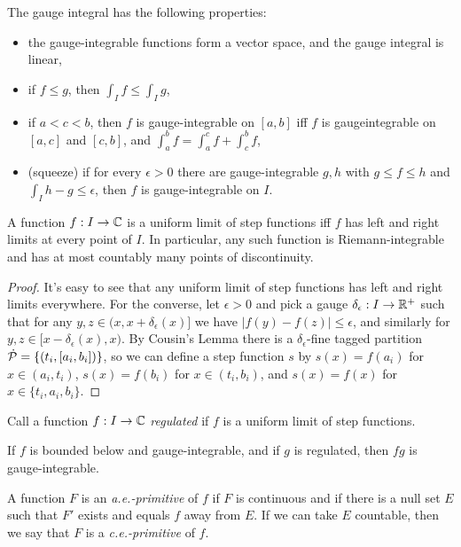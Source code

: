 \begin{prop} The gauge integral has the following properties:
\begin{itemize}
\item the gauge-integrable functions form a vector space, and the gauge integral is linear,
\item if $f \le g$, then $\int_I f \le \int_I g$,
\item if $a < c < b$, then $f$ is gauge-integrable on $[a,b]$ iff $f$ is gaugeintegrable on $[a,c]$ and $[c,b]$, and $\int_a^b f = \int_a^c f + \int_c^b f$,
\item (squeeze) if for every $\epsilon > 0$ there are gauge-integrable $g,h$ with $g \le f \le h$ and $\int_I h-g \le \epsilon$, then $f$ is gauge-integrable on $I$.
\end{itemize}
\end{prop}

\begin{prop} A function $f : I \rightarrow \mathbb{C}$ is a uniform limit of step functions iff $f$ has left and right limits at every point of $I$. In particular, any such function is Riemann-integrable and has at most countably many points of discontinuity.
\end{prop}
\begin{proof} It's easy to see that any uniform limit of step functions has left and right limits everywhere. For the converse, let $\epsilon > 0$ and pick a gauge $\delta_\epsilon : I \rightarrow \mathbb{R}^+$ such that for any $y, z \in (x, x + \delta_\epsilon(x)]$ we have $|f(y) - f(z)| \le \epsilon$, and similarly for $y,z \in [x - \delta_\epsilon(x), x)$. By Cousin's Lemma there is a $\delta_\epsilon$-fine tagged partition $\dot{\mathcal{P}} = \{(t_i,[a_i,b_i])\}$, so we can define a step function $s$ by $s(x) = f(a_i)$ for $x \in (a_i,t_i)$, $s(x) = f(b_i)$ for $x \in (t_i,b_i)$, and $s(x) = f(x)$ for $x \in \{t_i,a_i,b_i\}$.
\end{proof}

\begin{defn} Call a function $f : I \rightarrow \mathbb{C}$ \emph{regulated} if $f$ is a uniform limit of step functions.
\end{defn}

\begin{prop} If $f$ is bounded below and gauge-integrable, and if $g$ is regulated, then $fg$ is gauge-integrable.
\end{prop}

\begin{defn} A function $F$ is an \emph{a.e.-primitive} of $f$ if $F$ is continuous and if there is a null set $E$ such that $F'$ exists and equals $f$ away from $E$. If we can take $E$ countable, then we say that $F$ is a \emph{c.e.-primitive} of $f$.
\end{defn}

